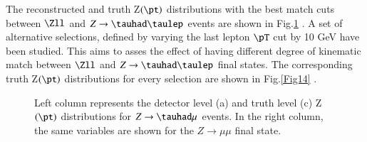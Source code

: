 The reconstructed and truth Z$(\pt)$ distributions with the best match cuts between $\Zll$ and $Z\to\tauhad\taulep$ events are shown in Fig.\ref{Fig13} . A set of alternative selections, defined by varying the last lepton $\pT$ cut by 10 GeV have been studied. This aims to asses the effect of having different degree of kinematic match between $\Zll$ and $Z\to\tauhad\taulep$ final states. The corresponding truth Z$(\pt)$ distributions for every selection are shown in Fig.\ref{Fig14} .

\begin{figure}[htbp]
	\centering
	\hfill
	\caption{Left column represents the detector level (a) and truth level (c) Z$(\pt)$ distributions for $Z\to\tauhad\mu$ events. In the right column, the same variables are shown for the $Z\to\mu\mu$ final state.}
	\label{Fig13}
\end{figure}

